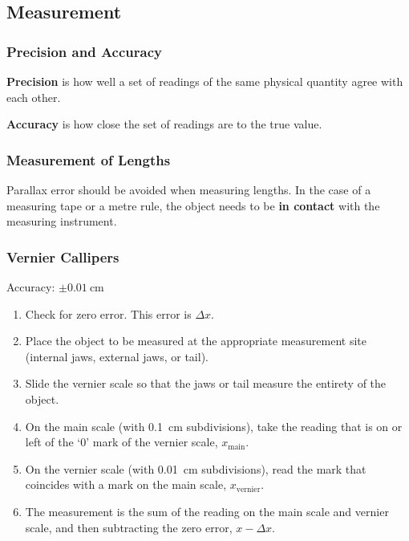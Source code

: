 \documentclass[../main.tex]{subfiles}
\begin{document}
		\subsection{Measurement}
		\subsubsection{Precision and Accuracy}
		
		\textbf{Precision} is how well a set of readings of the same physical quantity agree with each other.
		
		\textbf{Accuracy} is how close the set of readings are to the true value.
		
		\subsubsection{Measurement of Lengths}
		Parallax error should be avoided when measuring lengths. In the case of a measuring tape or a metre rule, the object needs to be \textbf{in contact} with the measuring instrument.
		
		\subsubsection*{Vernier Callipers}
		Accuracy: \(\pm \SI{0.01}{\centi\meter}\)
		\begin{enumerate}
			\item Check for zero error. This error is \(\Delta x\).
			\item Place the object to be measured at the appropriate measurement site (internal jaws, external jaws, or tail).
			\item Slide the vernier scale so that the jaws or tail measure the entirety of the object.
			\item On the main scale (with \SI{0.1}{\centi\meter} subdivisions), take the reading that is on or left of the `0' mark of the vernier scale, \(x_{\mathrm{main}}\).
			\item On the vernier scale (with \SI{0.01}{\centi\meter} subdivisions), read the mark that coincides with a mark on the main scale, \(x_{\mathrm{vernier}}\).
			\item The measurement is the sum of the reading on the main scale and vernier scale, and then subtracting the zero error, \(x-\Delta x\).
		\end{enumerate}
	
\end{document}
